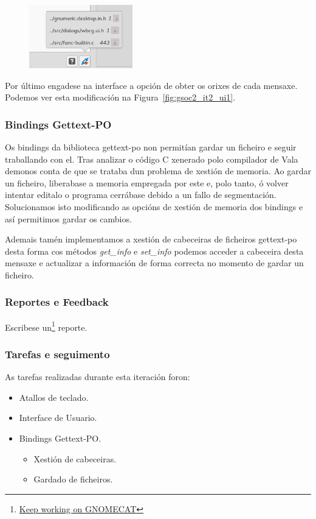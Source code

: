 \begin{figure}[h!]
    \centering
    \includegraphics[width=0.4\textwidth]{img/gsoc2_it2_ui3.png} 
    \caption{}
    \label{fig:gsoc2_it2_ui2}
\end{figure}

Por último engadese na interface a opción de obter os orixes de cada mensaxe. Podemos ver esta modificación na Figura~\ref{fig:gsoc2_it2_ui1}.


\subsubsection{Bindings Gettext-PO}
Os bindings da biblioteca gettext-po non permitían gardar un ficheiro e seguir traballando con el. Tras analizar o código C xenerado polo compilador de Vala demonos conta de que se trataba dun problema de xestión de memoria. Ao gardar un ficheiro, liberabase a memoria empregada por este e, polo tanto, ó volver intentar editalo o programa cerrábase debido a un fallo de segmentación. Solucionamos isto modificando as opcións de xestión de memoria dos bindings e así permitimos gardar os cambios.

Ademais tamén implementamos a xestión de cabeceiras de ficheiros gettext-po desta forma cos métodos \emph{get\_info} e \emph{set\_info} podemos acceder a cabeceira desta mensaxe e actualizar a información de forma correcta no momento de gardar un ficheiro.

\subsubsection{Reportes e Feedback}

Escribese un\footnote{\href{http://aquelando.info/keep-working-on-gnomecat/}{Keep working on GNOMECAT}} reporte.

\subsubsection{Tarefas e seguimento}

As tarefas realizadas durante esta iteración foron:

\begin{itemize}
  \item Atallos de teclado.
  \item Interface de Usuario.
  \item Bindings Gettext-PO.
    \begin{itemize}
      \item Xestión de cabeceiras.
      \item Gardado de ficheiros.
    \end{itemize}
\end{itemize}


